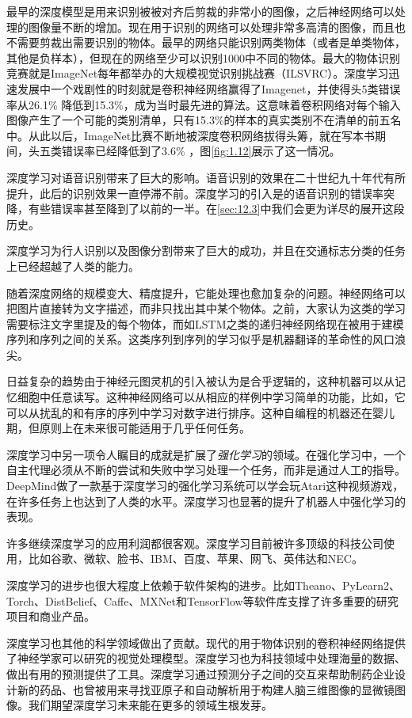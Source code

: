 \documentclass[a4paper,11pt]{book}
\begin{document}
最早的深度模型是用来识别被被对齐后剪裁的非常小的图像，之后神经网络可以处理的图像量不断的增加。现在用于识别的网络可以处理非常多高清的图像，而且也不需要剪裁出需要识别的物体。最早的网络只能识别两类物体（或者是单类物体，其他是负样本），但现在的网络至少可以识别1000中不同的物体。最大的物体识别竞赛就是ImageNet每年都举办的大规模视觉识别挑战赛（ILSVRC）。深度学习迅速发展中一个戏剧性的时刻就是卷积神经网络赢得了Imagenet，并使得头5类错误率从26.1\% 降低到15.3\%，成为当时最先进的算法。这意味着卷积网络对每个输入图像产生了一个可能的类别清单，只有15.3\%的样本的真实类别不在清单的前五名中。从此以后，ImageNet比赛不断地被深度卷积网络拔得头筹，就在写本书期间，头五类错误率已经降低到了3.6\% ，图\ref{fig:1.12}展示了这一情况。


深度学习对语音识别带来了巨大的影响。语音识别的效果在二十世纪九十年代有所提升，此后的识别效果一直停滞不前。深度学习的引入是的语音识别的错误率突降，有些错误率甚至降到了以前的一半。在\ref{sec:12.3}中我们会更为详尽的展开这段历史。


深度学习为行人识别以及图像分割带来了巨大的成功，并且在交通标志分类的任务上已经超越了人类的能力。


随着深度网络的规模变大、精度提升，它能处理也愈加复杂的问题。神经网络可以把图片直接转为文字描述，而非只找出其中某个物体。之前，大家认为这类的学习需要标注文字里提及的每个物体，而如LSTM之类的递归神经网络现在被用于建模序列和序列之间的关系。这类序列到序列的学习似乎是机器翻译的革命性的风口浪尖。


日益复杂的趋势由于神经元图灵机的引入被认为是合乎逻辑的，这种机器可以从记忆细胞中任意读写。这种神经网络可以从相应的样例中学习简单的功能，比如，它可以从扰乱的和有序的序列中学习对数字进行排序。这种自编程的机器还在婴儿期，但原则上在未来很可能适用于几乎任何任务。


深度学习中另一项令人瞩目的成就是扩展了\emph{强化学习}的领域。在强化学习中，一个自主代理必须从不断的尝试和失败中学习处理一个任务，而非是通过人工的指导。DeepMind做了一款基于深度学习的强化学习系统可以学会玩Atari这种视频游戏，在许多任务上也达到了人类的水平。深度学习也显著的提升了机器人中强化学习的表现。


许多继续深度学习的应用利润都很客观。深度学习目前被许多顶级的科技公司使用，比如谷歌、微软、脸书、IBM、百度、苹果、网飞、英伟达和NEC。


深度学习的进步也很大程度上依赖于软件架构的进步。比如Theano、PyLearn2、Torch、DistBelief、Caffe、MXNet和TensorFlow等软件库支撑了许多重要的研究项目和商业产品。


深度学习也其他的科学领域做出了贡献。现代的用于物体识别的卷积神经网络提供了神经学家可以研究的视觉处理模型。深度学习也为科技领域中处理海量的数据、做出有用的预测提供了工具。深度学习通过预测分子之间的交互来帮助制药企业设计新的药品、也曾被用来寻找亚原子和自动解析用于构建人脑三维图像的显微镜图像。我们期望深度学习未来能在更多的领域生根发芽。
\end{document}
